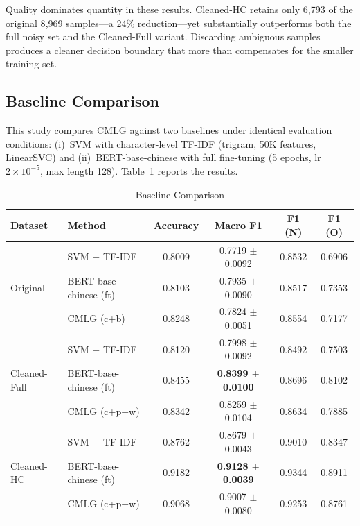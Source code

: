 ﻿\documentclass[12pt]{article}
\begin{document}
Quality dominates quantity in these results. Cleaned-HC retains only 6{,}793 of the original 8{,}969 samples---a 24\% reduction---yet substantially outperforms both the full noisy set and the Cleaned-Full variant. Discarding ambiguous samples produces a cleaner decision boundary that more than compensates for the smaller training set.

\subsection{Baseline Comparison}

This study compares CMLG against two baselines under identical evaluation conditions: (i)~SVM with character-level TF-IDF (trigram, 50K features, LinearSVC) and (ii)~BERT-base-chinese with full fine-tuning (5 epochs, lr $2\times10^{-5}$, max length 128). Table~\ref{tab:baselines} reports the results.

\begin{table}[htbp]
\centering
\caption{Baseline Comparison}
\label{tab:baselines}
\begin{tabular}{llcccc}
\toprule
Dataset & Method & Accuracy & Macro F1 & F1 (N) & F1 (O) \\
\midrule
\multirow{3}{*}{Original}
& SVM + TF-IDF          & 0.8009 & 0.7719 $\pm$ 0.0092 & 0.8532 & 0.6906 \\
& BERT-base-chinese (ft) & 0.8103 & 0.7935 $\pm$ 0.0090 & 0.8517 & 0.7353 \\
& CMLG (c+b)            & 0.8248 & 0.7824 $\pm$ 0.0051 & 0.8554 & 0.7177 \\
\midrule
\multirow{3}{*}{Cleaned-Full}
& SVM + TF-IDF          & 0.8120 & 0.7998 $\pm$ 0.0092 & 0.8492 & 0.7503 \\
& BERT-base-chinese (ft) & 0.8455 & \textbf{0.8399 $\pm$ 0.0100} & 0.8696 & 0.8102 \\
& CMLG (c+p+w)          & 0.8342 & 0.8259 $\pm$ 0.0104 & 0.8634 & 0.7885 \\
\midrule
\multirow{3}{*}{Cleaned-HC}
& SVM + TF-IDF          & 0.8762 & 0.8679 $\pm$ 0.0043 & 0.9010 & 0.8347 \\
& BERT-base-chinese (ft) & 0.9182 & \textbf{0.9128 $\pm$ 0.0039} & 0.9344 & 0.8911 \\
& CMLG (c+p+w)          & 0.9068 & 0.9007 $\pm$ 0.0080 & 0.9253 & 0.8761 \\
\bottomrule
\end{tabular}
\end{table}
\end{document}

